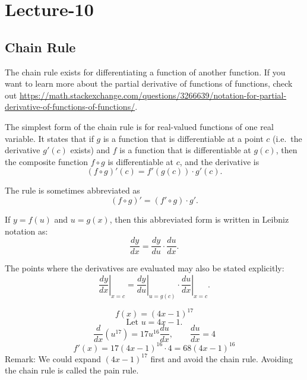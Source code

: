 \newpage
\section{Lecture-10}
\subsection{Chain Rule}
The chain rule exists for differentiating a function of another
function. If you want to learn more about the partial
derivative of functions of functions, check out \url{https://math.stackexchange.com/questions/3266639/notation-for-partial-derivative-of-functions-of-functions/}.

\begin{definition}
    The simplest form of the chain rule is for real-valued functions of one real variable. It states that if $g$ is a function that is differentiable at a point $c$ (i.e.\ the derivative $g'(c)$ exists) and $f$ is a function that is differentiable at $g(c)$, then the composite function $f \circ g$ is differentiable at $c$, and the derivative is
\[
(f \circ g)'(c) = f'(g(c)) \cdot g'(c).
\]

The rule is sometimes abbreviated as
\[
(f \circ g)' = (f' \circ g)\cdot g'.
\]

If $y=f(u)$ and $u=g(x)$, then this abbreviated form is written in Leibniz notation as:
\[
\frac{dy}{dx} = \frac{dy}{du}\cdot\frac{du}{dx}.
\]

The points where the derivatives are evaluated may also be stated explicitly:
\[
\left.\frac{dy}{dx}\right|_{x=c}
=
\left.\frac{dy}{du}\right|_{u=g(c)}
\cdot
\left.\frac{du}{dx}\right|_{x=c}.
\]
\end{definition}
\begin{example}
    \[
f(x)=(4x-1)^{17}
\]
\[
\text{Let } u=4x-1.
\]
\[
\frac{d}{dx}(u^{17})=17u^{16}\frac{du}{dx},\qquad \frac{du}{dx}=4
\]
\[
f'(x)=17(4x-1)^{16}\cdot 4=68(4x-1)^{16}
\]
Remark: We could expand $(4x-1)^{17}$ first and avoid the chain rule. Avoiding the chain rule is called the pain rule.
\end{example}
